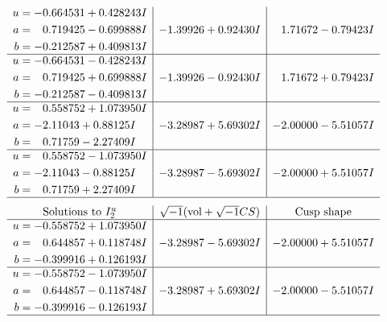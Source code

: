 \documentclass[1p]{elsarticle_modified}
\theoremstyle{definition}
\newcommand{\I}{\sqrt{-1}}
\begin{document}
$$\begin{array}{c|c|c}
\begin{aligned}
u &= -0.664531 + 0.428243 I \\
a &= \phantom{-}0.719425 - 0.699888 I \\
b &= -0.212587 + 0.409813 I\end{aligned}
 & -1.39926 + 0.92430 I & \phantom{-}1.71672 - 0.79423 I \\ \hline\begin{aligned}
u &= -0.664531 - 0.428243 I \\
a &= \phantom{-}0.719425 + 0.699888 I \\
b &= -0.212587 - 0.409813 I\end{aligned}
 & -1.39926 - 0.92430 I & \phantom{-}1.71672 + 0.79423 I \\ \hline\begin{aligned}
u &= \phantom{-}0.558752 + 1.073950 I \\
a &= -2.11043 + 0.88125 I \\
b &= \phantom{-}0.71759 - 2.27409 I\end{aligned}
 & -3.28987 + 5.69302 I & -2.00000 - 5.51057 I \\ \hline\begin{aligned}
u &= \phantom{-}0.558752 - 1.073950 I \\
a &= -2.11043 - 0.88125 I \\
b &= \phantom{-}0.71759 + 2.27409 I\end{aligned}
 & -3.28987 - 5.69302 I & -2.00000 + 5.51057 I\\
 \hline 
 \end{array}$$\newpage$$\begin{array}{c|c|c}  
\text{Solutions to }I^u_{2}& \I (\text{vol} + \sqrt{-1}CS) & \text{Cusp shape}\\
 \hline 
\begin{aligned}
u &= -0.558752 + 1.073950 I \\
a &= \phantom{-}0.644857 + 0.118748 I \\
b &= -0.399916 + 0.126193 I\end{aligned}
 & -3.28987 - 5.69302 I & -2.00000 + 5.51057 I \\ \hline\begin{aligned}
u &= -0.558752 - 1.073950 I \\
a &= \phantom{-}0.644857 - 0.118748 I \\
b &= -0.399916 - 0.126193 I\end{aligned}
 & -3.28987 + 5.69302 I & -2.00000 - 5.51057 I\\
 \hline 
 \end{array}$$\newpage\newpage\renewcommand{\arraystretch}{1}
\end{document}

